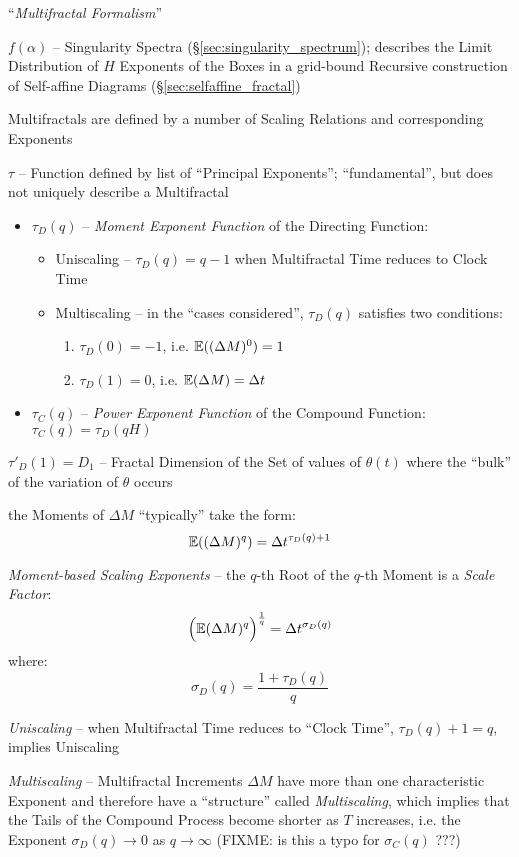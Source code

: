 ``\emph{Multifractal Formalism}''

$f(\alpha)$ -- Singularity Spectra (\S\ref{sec:singularity_spectrum}); describes
the Limit Distribution of $H$ Exponents of the Boxes in a grid-bound Recursive
construction of Self-affine Diagrams (\S\ref{sec:selfaffine_fractal})

Multifractals are defined by a number of Scaling Relations and corresponding
Exponents

$\tau$ -- Function defined by list of ``Principal Exponents''; ``fundamental'',
but does not uniquely describe a Multifractal

\begin{itemize}
  \item $\tau_D(q)$ -- \emph{Moment Exponent Function} of the Directing
    Function:
    \begin{itemize}
      \item Uniscaling -- $\tau_D(q) = q - 1$ when Multifractal Time reduces to
        Clock Time
      \item Multiscaling -- in the ``cases considered'', $\tau_D(q)$ satisfies
        two conditions:
        \begin{enumerate}
          \item $\tau_D(0) = -1$, i.e. $\mathbb{E}((\Delta M)^0) = 1$
          \item $\tau_D(1) = 0$, i.e. $\mathbb{E}(\Delta M) = \Delta t$
        \end{enumerate}
    \end{itemize}
  \item $\tau_C(q)$ -- \emph{Power Exponent Function} of the Compound Function:
    $\tau_C(q) = \tau_D(qH)$
\end{itemize}

$\tau'_D(1) = D_1$ -- Fractal Dimension of the Set of values of $\theta(t)$
where the ``bulk'' of the variation of $\theta$ occurs

the Moments of $\Delta M$ ``typically'' take the form:
\[
  \mathbb{E}((\Delta M)^q) = \Delta t^{\tau_D(q) + 1}
\]

\emph{Moment-based Scaling Exponents} -- the $q$-th Root of the $q$-th Moment is
a \emph{Scale Factor}:
\[
  \Big(\mathbb{E}(\Delta M)^q\Big)^\frac{1}{q} = \Delta t^{\sigma_D(q)}
\]
where:
\[
  \sigma_D(q) = \frac{1 + \tau_D(q)}{q}
\]

\emph{Uniscaling} -- when Multifractal Time reduces to ``Clock Time'',
$\tau_D(q) + 1 = q$, implies Uniscaling

\emph{Multiscaling} -- Multifractal Increments $\Delta M$ have more than one
characteristic Exponent and therefore have a ``structure'' called
\emph{Multiscaling}, which implies that the Tails of the Compound Process become
shorter as $T$ increases, i.e. the Exponent $\sigma_D(q) \to 0$ as
$q \to \infty$ (FIXME: is this a typo for $\sigma_C(q)$ ???)

